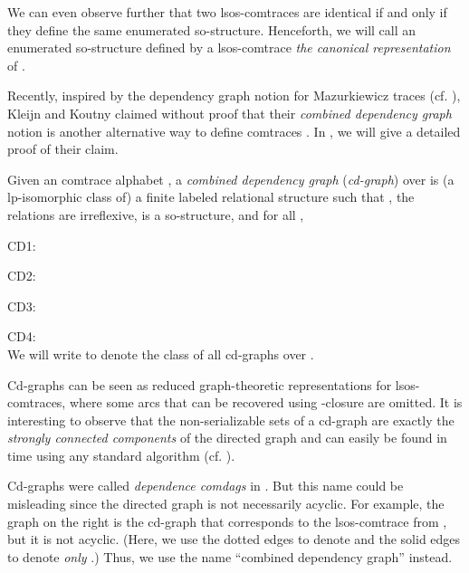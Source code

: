 \documentclass{llncs}
\begin{document}
We can even observe further that two lsos-comtraces are identical if and only if they define the same enumerated so-structure. Henceforth, we will call an enumerated so-structure defined by a lsos-comtrace  \emph{the canonical representation} of . 

Recently, inspired by the dependency graph notion for Mazurkiewicz traces (cf. \cite[Chapter 2]{DR}), Kleijn and Koutny claimed without proof that their \emph{combined dependency graph} notion is another alternative way to define comtraces \cite{KK08}. In , we will give a detailed proof of their claim.


\begin{definition} 
Given an comtrace alphabet , a \emph{combined dependency graph} (\emph{cd-graph}) over  is (a lp-isomorphic class of) a finite labeled relational structure  such that , the relations  are irreflexive,  is a so-structure, and for all ,\smallskip

\textsf{CD1:\mbox{\hspace{5mm}}} 

\textsf{CD2:\mbox{\hspace{5mm}}} 

\textsf{CD3:\mbox{\hspace{5mm}}} 

\textsf{CD4:\mbox{\hspace{5mm}}} \smallskip\\
We will write  to denote the class of all cd-graphs over . \EOD
\label{def:comdag}
\end{definition}

Cd-graphs can be seen as reduced graph-theoretic representations for lsos-comtraces, where some arcs that can be recovered using -closure are omitted. It is interesting to observe that the non-serializable sets of a cd-graph are exactly the \emph{strongly connected components} of the directed graph  and can easily be found in time  using any standard algorithm (cf. \cite[Section 22.5]{CLR}). \smallskip\\
\begin{minipage}{8.2cm}\begin{remark} Cd-graphs were called \emph{dependence comdags} in \cite{KK08}. But this name could be misleading since the directed graph  is not necessarily acyclic. For example, the graph on the right is the cd-graph that corresponds to  the lsos-comtrace from , but it is not acyclic. (Here, we use the dotted edges to denote  and the solid edges to denote \emph{only} .) Thus, we use the name ``combined dependency graph'' instead. \EOD\end{remark}
\end{minipage}
\begin{minipage}{4cm}\centering

\end{minipage}
\end{document}
